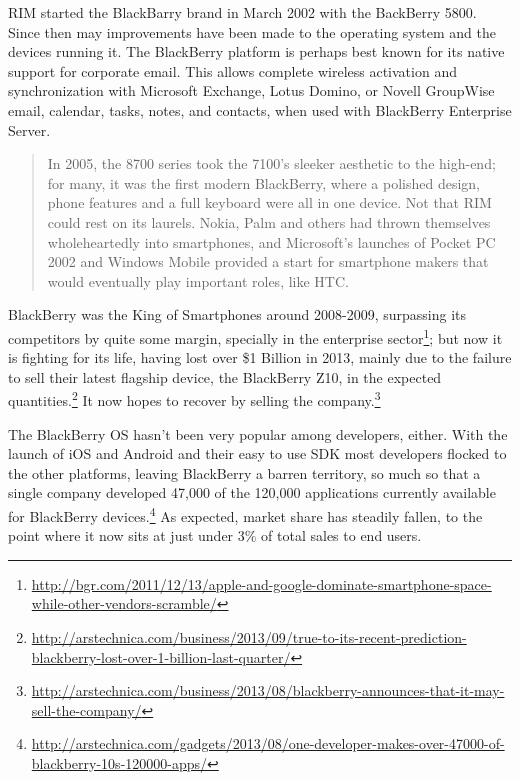 RIM started the BlackBarry brand in March 2002 with the BackBerry 5800. Since then may improvements have been made to the operating system and the devices running it. The BlackBerry platform is perhaps best known for its native support for corporate email. This allows complete wireless activation and synchronization with Microsoft Exchange, Lotus Domino, or Novell GroupWise email, calendar, tasks, notes, and contacts, when used with BlackBerry Enterprise Server.
\cite{wikipedia:bb}

\begin{quotation}
In 2005, the 8700 series took the 7100's sleeker aesthetic to the high-end; for many, it was the first modern BlackBerry, where a polished design, phone features and a full keyboard were all in one device. Not that RIM could rest on its laurels. Nokia, Palm and others had thrown themselves wholeheartedly into smartphones, and Microsoft's launches of Pocket PC 2002 and Windows Mobile provided a start for smartphone makers that would eventually play important roles, like HTC.
\cite{fingas:2013}
\end{quotation}


BlackBerry was the King of Smartphones around 2008-2009, surpassing its competitors by quite some margin, specially in the enterprise sector\footnote{\url{http://bgr.com/2011/12/13/apple-and-google-dominate-smartphone-space-while-other-vendors-scramble/}}; but now it is fighting for its life, having lost over \$1 Billion in 2013, mainly due to the failure to sell their latest flagship device, the BlackBerry Z10, in the expected quantities.\footnote{\url{http://arstechnica.com/business/2013/09/true-to-its-recent-prediction-blackberry-lost-over-1-billion-last-quarter/}} It now hopes to recover by selling the company.\footnote{\url{http://arstechnica.com/business/2013/08/blackberry-announces-that-it-may-sell-the-company/}}


The BlackBerry \ac{OS} hasn't been very popular among developers, either. With the launch of iOS and Android and their easy to use \ac{SDK} most developers flocked to the other platforms, leaving BlackBerry a barren territory, so much so that a single company developed 47,000 of the 120,000 applications currently available for BlackBerry devices.\footnote{\url{http://arstechnica.com/gadgets/2013/08/one-developer-makes-over-47000-of-blackberry-10s-120000-apps/}} As expected, market share has steadily fallen, to the point where it now sits at just under 3\% of total sales to end users.
  

